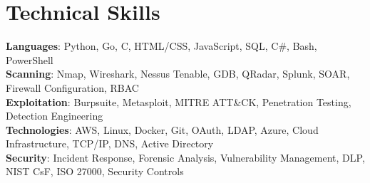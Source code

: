 \documentclass[letterpaper,11pt]{article}
\begin{document}
%
\section{Technical Skills}
 \begin{itemize}[leftmargin=0.15in, label={}]
    \small{\item{
     \textbf{Languages}{: Python, Go, C, HTML/CSS, JavaScript, SQL, C\#, Bash, PowerShell} \\
     \textbf{Scanning}{: Nmap, Wireshark, Nessus Tenable, GDB, QRadar, Splunk, SOAR, Firewall Configuration, RBAC} \\
     \textbf{Exploitation}{: Burpsuite, Metasploit, MITRE ATT\&CK, Penetration Testing, Detection Engineering} \\
     \textbf{Technologies}{: AWS, Linux, Docker, Git, OAuth, LDAP, Azure, Cloud Infrastructure, TCP/IP, DNS, Active Directory} \\
     \textbf{Security}{: Incident Response, Forensic Analysis, Vulnerability Management, DLP, NIST CsF, ISO 27000, Security Controls} \\
    }}
 \end{itemize}
 \vspace{-16pt}
\end{document}
